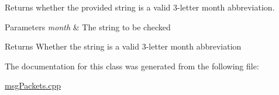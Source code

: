Returns whether the provided string is a valid 3-\/letter month abbreviation. 


\begin{DoxyParams}{Parameters}
{\em month} & The string to be checked \\
\hline
\end{DoxyParams}
\begin{DoxyReturn}{Returns}
Whether the string is a valid 3-\/letter month abbreviation 
\end{DoxyReturn}


The documentation for this class was generated from the following file\-:\begin{DoxyCompactItemize}
\item 
\hyperlink{msgPackets_8cpp}{msg\-Packets.\-cpp}\end{DoxyCompactItemize}
